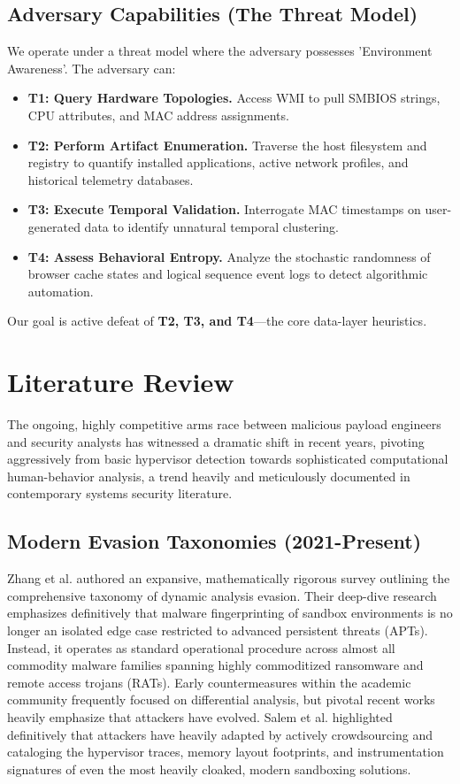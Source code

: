 \documentclass{ieeeaccess}
\begin{document}
\subsection{Adversary Capabilities (The Threat Model)}
We operate under a threat model where the adversary possesses 'Environment Awareness'. The adversary can:
\begin{itemize}
\item \textbf{T1: Query Hardware Topologies.} Access WMI to pull SMBIOS strings, CPU attributes, and MAC address assignments.
\item \textbf{T2: Perform Artifact Enumeration.} Traverse the host filesystem and registry to quantify installed applications, active network profiles, and historical telemetry databases.
\item \textbf{T3: Execute Temporal Validation.} Interrogate MAC timestamps on user-generated data to identify unnatural temporal clustering.
\item \textbf{T4: Assess Behavioral Entropy.} Analyze the stochastic randomness of browser cache states and logical sequence event logs to detect algorithmic automation.
\end{itemize}

Our goal is active defeat of \textbf{T2, T3, and T4}—the core data-layer heuristics.

\section{Literature Review}

The ongoing, highly competitive arms race between malicious payload engineers and security analysts has witnessed a dramatic shift in recent years, pivoting aggressively from basic hypervisor detection towards sophisticated computational human-behavior analysis, a trend heavily and meticulously documented in contemporary systems security literature.

\subsection{Modern Evasion Taxonomies (2021-Present)}
Zhang et al. \cite{b1} authored an expansive, mathematically rigorous survey outlining the comprehensive taxonomy of dynamic analysis evasion. Their deep-dive research emphasizes definitively that malware fingerprinting of sandbox environments is no longer an isolated edge case restricted to advanced persistent threats (APTs). Instead, it operates as standard operational procedure across almost all commodity malware families spanning highly commoditized ransomware and remote access trojans (RATs). Early countermeasures within the academic community frequently focused on differential analysis, but pivotal recent works heavily emphasize that attackers have evolved. Salem et al. \cite{b4} highlighted definitively that attackers have heavily adapted by actively crowdsourcing and cataloging the hypervisor traces, memory layout footprints, and instrumentation signatures of even the most heavily cloaked, modern sandboxing solutions. 
\end{document}

